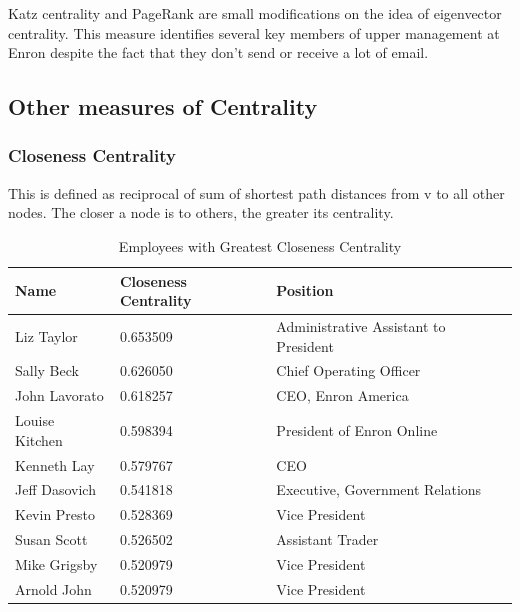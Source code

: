 \documentclass[12pt]{article}
\begin{document}
	Katz centrality and PageRank are small modifications on the idea of eigenvector centrality. This measure identifies several key members of upper management at Enron despite the fact that they don't send or receive a lot of email.
	
	\subsection{Other measures of Centrality}
	
	\subsubsection{Closeness Centrality} This is defined as reciprocal of sum of shortest path distances from v to all other nodes. The closer a node is to others, the greater its centrality.

        \begin{table}[h]
        \caption{Employees with Greatest Closeness Centrality}
        \centering
        \begin{tabular}{|l|l|l|}
        \hline
        \textbf{Name} & \textbf{Closeness Centrality} & \textbf{Position}                     \\ \hline
        Liz Taylor        & 0.653509                      & Administrative Assistant to President \\ \hline
        Sally Beck        & 0.626050                      & Chief Operating Officer               \\ \hline
        John Lavorato     & 0.618257                      & CEO, Enron America                    \\ \hline
        Louise Kitchen    & 0.598394                      & President of Enron Online             \\ \hline
        Kenneth Lay       & 0.579767                      & CEO                                   \\ \hline
        Jeff Dasovich     & 0.541818                      & Executive, Government Relations       \\ \hline
        Kevin Presto      & 0.528369                      & Vice President                        \\ \hline
        Susan Scott       & 0.526502                      & Assistant Trader                      \\ \hline
        Mike Grigsby      & 0.520979                      & Vice President                        \\ \hline
        Arnold John       & 0.520979                      & Vice President                        \\ \hline
        \end{tabular}
        \end{table}
        
\end{document}
